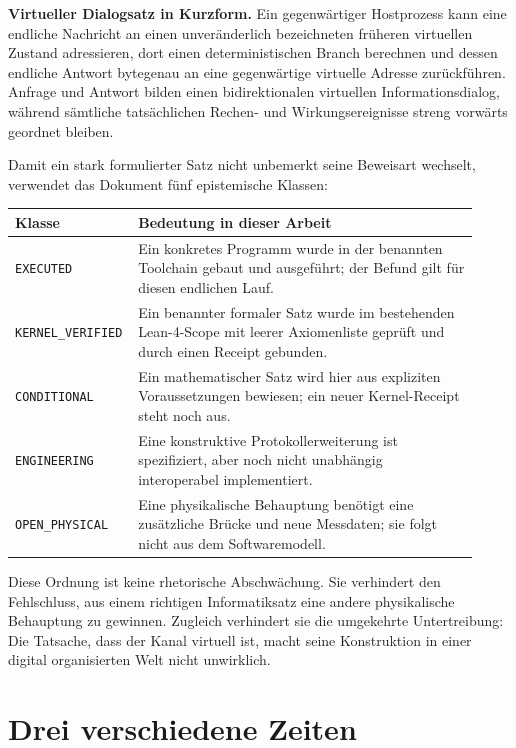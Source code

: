 \documentclass[11pt,a4paper]{article}
\theoremstyle{remark}
\newcommand{\statusbox}[2]{%
  \par\medskip\noindent
  \colorbox{#1}{\parbox{\dimexpr\linewidth-2\fboxsep\relax}{#2}}%
  \par\medskip
}
\begin{document}
\statusbox{QGreen}{
\textbf{Virtueller Dialogsatz in Kurzform.}
Ein gegenwärtiger Hostprozess kann eine endliche Nachricht an einen
unveränderlich bezeichneten früheren virtuellen Zustand adressieren, dort
einen deterministischen Branch berechnen und dessen endliche Antwort
bytegenau an eine gegenwärtige virtuelle Adresse zurückführen. Anfrage und
Antwort bilden einen bidirektionalen virtuellen Informationsdialog, während
sämtliche tatsächlichen Rechen- und Wirkungsereignisse streng vorwärts
geordnet bleiben.
}

Damit ein stark formulierter Satz nicht unbemerkt seine Beweisart wechselt,
verwendet das Dokument fünf epistemische Klassen:

\begin{longtable}{@{}L{0.20\linewidth}L{0.72\linewidth}@{}}
\toprule
\textbf{Klasse} & \textbf{Bedeutung in dieser Arbeit} \\
\midrule
\endhead
\texttt{EXECUTED} & Ein konkretes Programm wurde in der benannten Toolchain
gebaut und ausgeführt; der Befund gilt für diesen endlichen Lauf.\\
\texttt{KERNEL\_VERIFIED} & Ein benannter formaler Satz wurde im bestehenden
Lean-4-Scope mit leerer Axiomenliste geprüft und durch einen Receipt gebunden.\\
\texttt{CONDITIONAL} & Ein mathematischer Satz wird hier aus expliziten
Voraussetzungen bewiesen; ein neuer Kernel-Receipt steht noch aus.\\
\texttt{ENGINEERING} & Eine konstruktive Protokollerweiterung ist spezifiziert,
aber noch nicht unabhängig interoperabel implementiert.\\
\texttt{OPEN\_PHYSICAL} & Eine physikalische Behauptung benötigt eine
zusätzliche Brücke und neue Messdaten; sie folgt nicht aus dem Softwaremodell.\\
\bottomrule
\end{longtable}

Diese Ordnung ist keine rhetorische Abschwächung. Sie verhindert den
Fehlschluss, aus einem richtigen Informatiksatz eine andere physikalische
Behauptung zu gewinnen. Zugleich verhindert sie die umgekehrte
Untertreibung: Die Tatsache, dass der Kanal virtuell ist, macht seine
Konstruktion in einer digital organisierten Welt nicht unwirklich.

\section{Drei verschiedene Zeiten}
\end{document}
